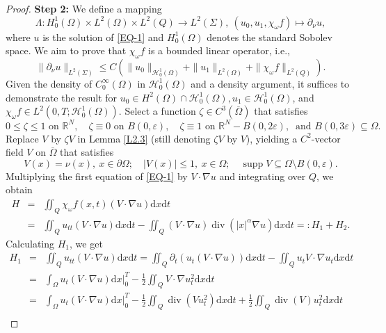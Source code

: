 \documentclass[11pt]{article}
\numberwithin{equation}{section}
\def\pt{\partial}
\def\ra{\rightarrow}
\def\s{\subseteq}
\def\e{\varepsilon }
\def\ol{\overline}
\def\bf{\textbf}
\def\pt{\partial}
\def\Om{\Omega}
\def\al{\alpha}
\def\La{\Lambda}
\def\ts{\times}
\def\iy{\infty}
\def\f{\frac}
\def\se{\setminus}
\def\df{\mathrm d}
\def\mcH{\mathcal{H}}
\DeclareMathOperator{\Div}{div}
\DeclareMathOperator{\supp}{{supp}}
\newcommand{\R}{\mathbb R}
\begin{document}
\begin{proof}
			{\bf {\bf Step 2:}}  We define a mapping
			\begin{equation*}
				\La: H_0^1(\Om)\ts L^2(\Om)\ts L^2(Q)\ra L^2(\Sigma), \  (u_0, u_1, \chi_\omega f)\mapsto \pt_\nu u,
			\end{equation*}
			where $u$ is the solution of \eqref{EQ-1} and $H_0^1(\Om)$ denotes the standard Sobolev space. We aim to prove that $\chi_\omega f$  is a bounded linear operator, i.e.,
			\begin{equation}\label{10.02.2}
				\|\pt_\nu u\|_{L^2(\Sigma)}\leq C\left(\|u_0\|_{\mcH_0^1(\Om)}+\|u_1\|_{L^2(\Om)}+\|\chi_\omega f\|_{L^2(Q)}\right).
			\end{equation}
			Given the density of $C_0^\iy(\Om)$   in $\mcH_0^1(\Om)$
			and a density argument, it suffices to demonstrate the result for  $u_0\in H^2(\Om)\cap \mathcal{H}_0^1(\Om), u_1\in \mcH_0^1(\Om)$,
			and $\chi_\omega f\in L^2(0,T; \mcH_0^1(\Om))$. Select a function $\zeta\in C^3(\ol\Om)$ that satisfies
			\begin{equation*}
				0\leq \zeta\leq 1 \mbox{ on }\R^N, \quad \zeta\equiv 0 \mbox{ on } B(0,\e), \quad \zeta\equiv 1 \mbox{ on }\R^N-B(0,2\e), \ \mbox{ and } B(0,3\e)\s \Om.
			\end{equation*}
			Replace $V$ by $\zeta V$ in Lemma \ref{L2.3} (still denoting  $\zeta V$ by $V$), yielding a
			$C^2$-vector field  $V$ on $\ol\Om$  that satisfies
			\begin{equation*}
				V(x)=\nu(x), \ x\in\pt\Om; \quad |V(x)|\leq 1,  \ x\in \Om; \quad \supp V\s \Om\se B(0,\e).
			\end{equation*}
			Multiplying the first equation of \eqref{EQ-1} by $V\cdot\nabla u$ and integrating over $Q$, we obtain
			\begin{eqnarray*}
				H
				&=&\iint_Q\chi_\omega f(x,t)(V\cdot\nabla u)\df x\df t\\
				&=&\iint_Q u_{tt}(V\cdot\nabla u)\df x\df t-\iint_Q (V\cdot\nabla u)\Div\left(|x|^\al \nabla u\right)\df x  \df t=: H_1+H_2.
			\end{eqnarray*}
			Calculating $H_1$, we get
			\begin{eqnarray*}
				H_1
				&=&\iint_Q u_{tt}(V\cdot\nabla u)\df x\df t=\iint_Q\pt_t\left(u_t(V\cdot\nabla u)\right)\df x\df t-\iint_Q u_t V\cdot \nabla u_t\df x\df t\\
				&=&\int_\Om u_t(V\cdot\nabla u)\df x\Big|_0^T-\f{1}{2}\iint_Q V\cdot \nabla u_t^2\df x\df t\\
				&=&\int_\Om u_t(V\cdot\nabla u)\df x\Big|_0^T-\f{1}{2}\iint_Q\Div\left(V u_t^2\right)\df x\df t+\f{1}{2}\iint_Q \Div (V) u_t^2\df x\df t\\

\end{eqnarray*}
\end{proof}
\end{document}
